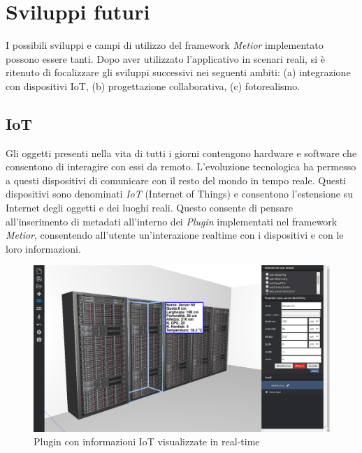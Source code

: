 \section{Sviluppi futuri}
\label{sec:conclusions_section_2}

I possibili sviluppi e campi di utilizzo del framework \emph{Metior} implementato possono essere tanti.
Dopo aver utilizzato l'applicativo in scenari reali, si è ritenuto di focalizzare gli sviluppi successivi nei seguenti ambiti:
(a) integrazione con dispositivi IoT, (b) progettazione collaborativa, (c) fotorealismo.

\subsection{IoT}
\label{sec:conclusions_section_2_sub_1}
Gli oggetti presenti nella vita di tutti i giorni contengono hardware e software
che consentono di interagire con essi da remoto. L'evoluzione tecnologica ha permesso a questi dispositivi
di comunicare con il resto del mondo in tempo reale. Questi dispositivi sono denominati \emph{IoT} (Internet of Things) e
consentono l'estensione su Internet degli oggetti e dei luoghi reali. Questo consente di pensare all'inserimento di
metadati all'interno dei \emph{Plugin} implementati nel framework \emph{Metior},
consentendo all'utente un'interazione realtime con i dispositivi e con le loro informazioni.\\

\begin{figure}[htbp] %
   \centering
   \includegraphics[width=1\linewidth]{images/iot}
   \caption{Plugin con informazioni IoT visualizzate in real-time}
   \label{fig:iot}
   \end{figure}

\newpage

